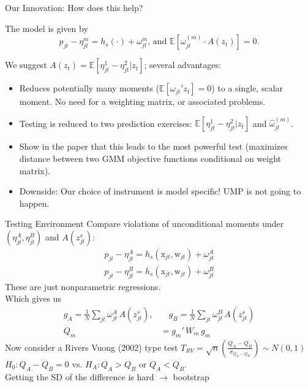 \begin{frame}[plain,label=innovation]{Our Innovation: How does this help?}
\begin{small}
The model is given by
$$p_{jt} - \eta^m_{jt} = h_s(\cdot) +  \omega^m_{jt} \text{,   and  } \mathbb{E}[\omega_{jt}^{(m)}\cdot A(z_t)] = 0.$$

We suggest $A(z_t) = \mathbb{E}[\eta^1_{jt}-\eta_{jt}^2|z_{t}]$; several advantages:

\begin{itemize}
\item Reduces potentially many moments ($\mathbb{E}[\omega_{jt}' z_t]=0$) to a single, scalar moment. No need for a weighting matrix, or associated problems.
\item Testing is reduced to two prediction exercises: $\mathbb{E}[\eta^1_{jt}-\eta_{jt}^2|z_{t}]$ and $\widehat \omega_{jt}^{(m)}$.
\item Show in the paper that this leads to the most powerful test (maximizes distance between two GMM objective functions conditional on weight matrix).
\item Downside: Our choice of instrument is \alert{model specific}! UMP is not going to happen.
\end{itemize}
\end{small}
\end{frame}



\begin{frame}{Testing Environment}
Compare violations of unconditional moments under $(\eta_{jt}^A, \eta_{jt}^B)$ and $A(z_{jt}^s)$:
\begin{align*}
p_{jt} -  \eta_{jt}^A = h_s(\textrm{x}_{jt},\textrm{w}_{jt}) + \omega_{jt}^{A}\\
p_{jt} -  \eta_{jt}^B = h_s(\textrm{x}_{jt},\textrm{w}_{jt}) + \omega_{jt}^{B}
\end{align*}
These are just \alert{nonparametric regressions}.\\

Which gives us
\begin{align*}
g_A = \frac{1}{N} \sum_{jt} \omega_{jt}^{A}\, A(z_{jt}^s), &\quad
g_B =\frac{1}{N} \sum_{jt}  \omega_{jt}^{B}\, A(z_{jt}^s)\\
Q_m &= g_m'\, W_m\, g_m
\end{align*}
Now consider a \alert{Rivers Vuong (2002)} type test $T_{RV} = \sqrt{n} \left(\frac{Q_A - Q_B}{\sigma_{Q_A - Q_B}}\right) \sim N(0,1)$
$H_0: Q_A - Q_B=0$ vs. $H_A: Q_A > Q_B$ or $Q_A < Q_B$.\\
Getting the SD of the difference is hard $\rightarrow$ bootstrap 
\end{frame}



